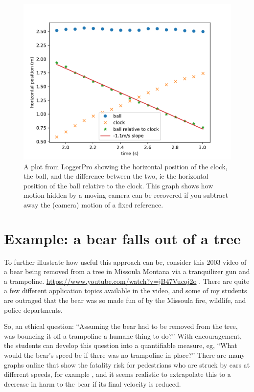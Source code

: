 \documentclass[12pt]{iopart}
\begin{document}
\begin{figure}[h]
\centering
\includegraphics[width=\columnwidth]{figure_5_Etkina-X-T-plot.pdf}
\caption{
A plot from LoggerPro showing the horizontal position of the clock, the ball, and the difference between the two, ie the horizontal position of the ball relative to the clock.  This graph shows how motion hidden by a moving camera can be recovered if you subtract away the (camera) motion of a fixed reference.
}
\label{Etkina-X-T-plot}
\end{figure}

\clearpage

\section{Example: a bear falls out of a tree}
To further illustrate how useful this approach can be, consider this 2003 video of a bear being removed from a tree in Missoula Montana via a tranquilizer gun and a trampoline. \url{https://www.youtube.com/watch?v=jB47Vucoj2o} \cite{bear_video_source}.  
There are quite a few different application topics available in the video, and some of my students are outraged that the bear was so made fun of by the Missoula fire, wildlife, and police departments.  

So, an ethical question: ``Assuming the bear had to be removed from the tree, was bouncing it off a trampoline a humane thing to do?''  With encouragement, the students can develop this question into a quantifiable measure, eg, ``What would the bear's speed be if there was no trampoline in place?''  There are many graphs online that show the fatality risk for pedestrians who are struck by cars at different speeds, for example \cite{AccidentRisk}, and it seems realistic to extrapolate this to a decrease in harm to the bear if its final velocity is reduced.
\end{document}
